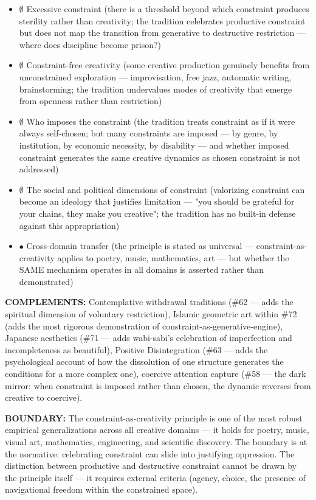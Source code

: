 \begin{itemize}[nosep,leftmargin=*]
  \item $\emptyset$ Excessive constraint (there is a threshold beyond which constraint produces sterility rather than creativity; the tradition celebrates productive constraint but does not map the transition from generative to destructive restriction — where does discipline become prison?)
  \item $\emptyset$ Constraint-free creativity (some creative production genuinely benefits from unconstrained exploration — improvisation, free jazz, automatic writing, brainstorming; the tradition undervalues modes of creativity that emerge from openness rather than restriction)
  \item $\emptyset$ Who imposes the constraint (the tradition treats constraint as if it were always self-chosen; but many constraints are imposed — by genre, by institution, by economic necessity, by disability — and whether imposed constraint generates the same creative dynamics as chosen constraint is not addressed)
  \item $\emptyset$ The social and political dimensions of constraint (valorizing constraint can become an ideology that justifies limitation — "you should be grateful for your chains, they make you creative"; the tradition has no built-in defense against this appropriation)
  \item $\bullet$ Cross-domain transfer (the principle is stated as universal — constraint-as-creativity applies to poetry, music, mathematics, art — but whether the SAME mechanism operates in all domains is asserted rather than demonstrated)
\end{itemize}


\textbf{COMPLEMENTS:} Contemplative withdrawal traditions (\#62 — adds the spiritual dimension of voluntary restriction), Islamic geometric art within \#72 (adds the most rigorous demonstration of constraint-as-generative-engine), Japanese aesthetics (\#71 — adds wabi-sabi's celebration of imperfection and incompleteness as beautiful), Positive Disintegration (\#63 — adds the psychological account of how the dissolution of one structure generates the conditions for a more complex one), coercive attention capture (\#58 — the dark mirror: when constraint is imposed rather than chosen, the dynamic reverses from creative to coercive).


\textbf{BOUNDARY:} The constraint-as-creativity principle is one of the most robust empirical generalizations across all creative domains — it holds for poetry, music, visual art, mathematics, engineering, and scientific discovery. The boundary is at the normative: celebrating constraint can slide into justifying oppression. The distinction between productive and destructive constraint cannot be drawn by the principle itself — it requires external criteria (agency, choice, the presence of navigational freedom within the constrained space).


